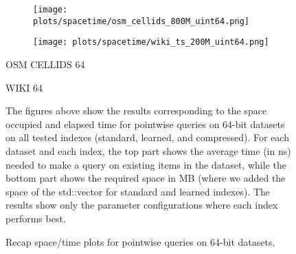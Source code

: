 \documentclass{article}
\begin{document}
\begin{figure}[!htbp]
{\begin{minipage}[t][0.98\textheight][t]{\textwidth}
    \begin{minipage}{0.48\linewidth}
        \begin{figure}[H]
        \texttt{[image: plots/spacetime/osm\_cellids\_800M\_uint64.png]}
        \end{figure}
    \end{minipage}
    \begin{minipage}{0.48\linewidth}
        \begin{figure}[H]
        \texttt{[image: plots/spacetime/wiki\_ts\_200M\_uint64.png]}
        \end{figure}
    \end{minipage}
    \begin{minipage}{0.48\linewidth}
    \begin{center}
        OSM CELLIDS 64
    \end{center}
    \end{minipage}
    \begin{minipage}{0.48\linewidth}
    \begin{center}
        WIKI 64
    \end{center}
    \end{minipage}

    \vspace{20px}
    
    \begin{minipage}{\linewidth}
        The figures above show the results corresponding to the space occupied and elapsed time for pointwise queries on 64-bit datasets on all tested indexes (standard, learned, and compressed). For each dataset and each index, the top part shows the average time (in ns) needed to make a query on existing items in the dataset, while the bottom part shows the required space in MB (where we added the space of the std::vector for standard and learned indexes).  
    The results show only the parameter configurations where each index performs best. 
    \end{minipage}
    \vspace{20px}
\end{minipage}
}
\caption{Recap space/time plots for pointwise queries on 64-bit datasets.}
\end{figure}
\end{document}

